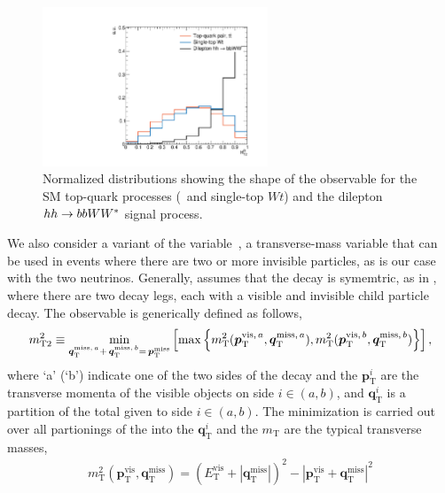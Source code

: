 \begin{figure}[!htb]
    \begin{center}
        \includegraphics[width=0.6\textwidth]{figures/search_hh/signal_pheno/shape_plots/hh_shape_plot_HT2Ratio}
        \caption{
            Normalized distributions showing the shape of the \htratio observable for the SM
            top-quark processes (\ttbar~and single-top $Wt$) and the dilepton $hh \rightarrow bbWW^*$ signal process.
        }
        \label{fig:hh_shape_htratio}
    \end{center}
\end{figure}

We also consider a variant of the \mttwo variable~\cite{MT2-Glamour,Lester2011,MT2-Tovey-Masses,Lester2014yga},
a transverse-mass variable that can be used in events where there are two or more invisible particles,
as is our case with the two neutrinos.
Generally, \mttwo assumes that the decay is symemtric, as in \ttbar, where there are two decay legs, each with
a visible and invisible child particle decay.
The \mttwo observable is generically defined as follows,
\begin{align}
    m_{\text{T2}}^2 \equiv \min\limits_{ \bm{q}_{\text{T}}^{\text{miss},\,a} + \, \bm{q}_{\text{T}}^{\text{miss},\,b} = \,\bm{p}_{\text{T}}^{\text{miss}}}
        \left[
            \max
                \left\{
                    m_{\text{T}}^2 ( \bm{p}_{\text{T}}^{\text{vis},\, a}, \bm{q}_{\text{T}}^{\text{miss},\,a} ), m_{\text{T}}^2 (\bm{p}_{\text{T}}^{\text{vis},\, b}, \bm{q}_{\text{T}}^{\text{miss},\,b} )
                \right\}
        \right],
    \label{eq:mttwo_def}
\end{align}
where `a' (`b') indicate one of the two sides of the decay and the $\bm{p}_{\text{T}}^i$ are the transverse momenta
of the visible objects on side $i \in (a,b)$, and $\bm{q}_{\text{T}}^i$ is a partition of the total \ptmiss given to side $i \in (a,b)$.
The minimization is carried out over all partionings of the \ptmiss into the $\bm{q}_{\text{T}}^i$ and the $m_{\text{T}}$ are the typical
transverse masses,
\begin{align}
    m_{\text{T}}^2 (\bm{p}_{\text{T}}^{\text{vis}}, \bm{q}_{\text{T}}^{\text{miss}} ) = ( E_{\text{T}}^{\text{vis}} + | \bm{q}_{\text{T}}^{\text{miss}} |)^2
            - |\bm{p}_{\text{T}}^{\text{vis}} + \bm{q}_{\text{T}}^{\text{miss}} |^2
    \label{eq:mt_def}
\end{align}

